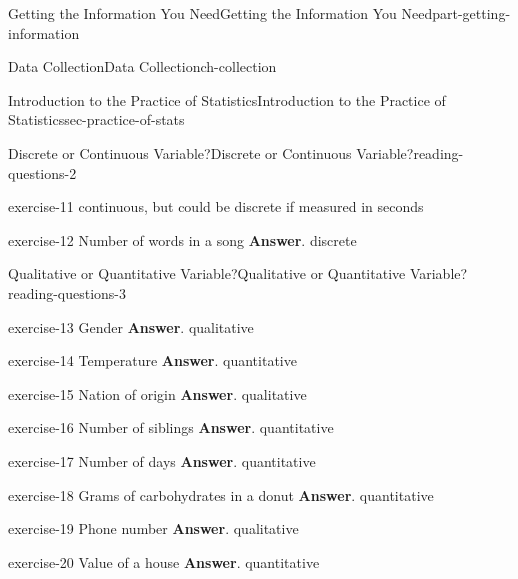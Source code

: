 \documentclass[oneside,10pt,]{book}
\numberwithin{equation}{section}
\begin{document}
\begin{partptx}{Getting the Information You Need}{}{Getting the Information You Need}{}{}{part-getting-information}
\begin{chapterptx}{Data Collection}{}{Data Collection}{}{}{ch-collection}
\begin{sectionptx}{Introduction to the Practice of Statistics}{}{Introduction to the Practice of Statistics}{}{}{sec-practice-of-stats}
\begin{reading-questions-subsection-numberless}{Discrete or Continuous Variable?}{}{Discrete or Continuous Variable?}{}{}{reading-questions-2}
\begin{divisionexercise}{6}{}{}{exercise-11}
continuous, but could be discrete if measured in seconds\end{divisionexercise}%
\begin{divisionexercise}{7}{}{}{exercise-12}%
Number of words in a song \textbf{Answer}.\hypertarget{answer-12}{}\quad%
discrete\end{divisionexercise}%
\end{reading-questions-subsection-numberless}
%
%
\typeout{************************************************}
\typeout{************************************************}
%
\begin{reading-questions-subsection-numberless}{Qualitative or Quantitative Variable?}{}{Qualitative or Quantitative Variable?}{}{}{reading-questions-3}
\begin{divisionexercise}{1}{}{}{exercise-13}%
Gender \textbf{Answer}.\hypertarget{answer-13}{}\quad%
qualitative\end{divisionexercise}%
\begin{divisionexercise}{2}{}{}{exercise-14}%
Temperature \textbf{Answer}.\hypertarget{answer-14}{}\quad%
quantitative\end{divisionexercise}%
\begin{divisionexercise}{3}{}{}{exercise-15}%
Nation of origin \textbf{Answer}.\hypertarget{answer-15}{}\quad%
qualitative\end{divisionexercise}%
\begin{divisionexercise}{4}{}{}{exercise-16}%
Number of siblings \textbf{Answer}.\hypertarget{answer-16}{}\quad%
quantitative\end{divisionexercise}%
\begin{divisionexercise}{5}{}{}{exercise-17}%
Number of days \textbf{Answer}.\hypertarget{answer-17}{}\quad%
quantitative\end{divisionexercise}%
\begin{divisionexercise}{6}{}{}{exercise-18}%
Grams of carbohydrates in a donut \textbf{Answer}.\hypertarget{answer-18}{}\quad%
quantitative\end{divisionexercise}%
\begin{divisionexercise}{7}{}{}{exercise-19}%
Phone number \textbf{Answer}.\hypertarget{answer-19}{}\quad%
qualitative\end{divisionexercise}%
\begin{divisionexercise}{8}{}{}{exercise-20}%
Value of a house \textbf{Answer}.\hypertarget{answer-20}{}\quad%
quantitative\end{divisionexercise}%

\end{reading-questions-subsection-numberless}
\end{sectionptx}
\end{chapterptx}
\end{partptx}
\end{document}
